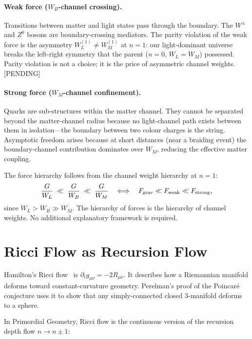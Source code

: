 \documentclass[prd,twocolumn,preprintnumbers,amsmath,amssymb]{revtex4-2}
\newcommand{\pending}{\textcolor{red!70!black}{[PENDING]}}
\newcommand{\WL}{W_{L}}
\newcommand{\WB}{W_{B}}
\newcommand{\WM}{W_{M}}
\begin{document}
\paragraph{Weak force ($\WB$-channel crossing).}
Transitions between matter and light states pass through the boundary.  The
$W^\pm$ and $Z^0$ bosons are boundary-crossing mediators.  The parity violation
of the weak force is the asymmetry $\WL^{(1)} \neq \WM^{(1)}$ at $n=1$: our
light-dominant universe breaks the left-right symmetry that the parent ($n=0$,
$\WL = \WM$) possessed.  Parity violation is not a choice; it is the price of
asymmetric channel weights.  \pending

\paragraph{Strong force ($\WM$-channel confinement).}
Quarks are sub-structures within the matter channel.  They cannot be separated
beyond the matter-channel radius because no light-channel path exists between
them in isolation---the boundary between two colour charges is the string.
Asymptotic freedom arises because at short distances (near a braiding event)
the boundary-channel contribution dominates over $\WM$, reducing the effective
matter coupling.

The force hierarchy follows from the channel weight hierarchy at $n=1$:
\begin{equation}
  \frac{G}{\WL} \;\ll\; \frac{G}{\WB} \;\ll\; \frac{G}{\WM}
  \quad\Longleftrightarrow\quad
  F_{\rm grav} \ll F_{\rm weak} \ll F_{\rm strong},
\end{equation}
since $\WL > \WB \gg \WM$.  The hierarchy of forces is the hierarchy of
channel weights.  No additional explanatory framework is required.

\section{Ricci Flow as Recursion Flow}
\label{sec:ricci}

Hamilton's Ricci flow~\cite{Hamilton1982} is $\partial_t g_{\mu\nu} = -2R_{\mu\nu}$.
It describes how a Riemannian manifold deforms toward constant-curvature geometry.
Perelman's proof of the Poincaré conjecture uses it to show that any simply-connected
closed 3-manifold deforms to a sphere.

In Primordial Geometry, Ricci flow is the continuous version of the recursion depth
flow $n \to n\pm1$:
\end{document}
